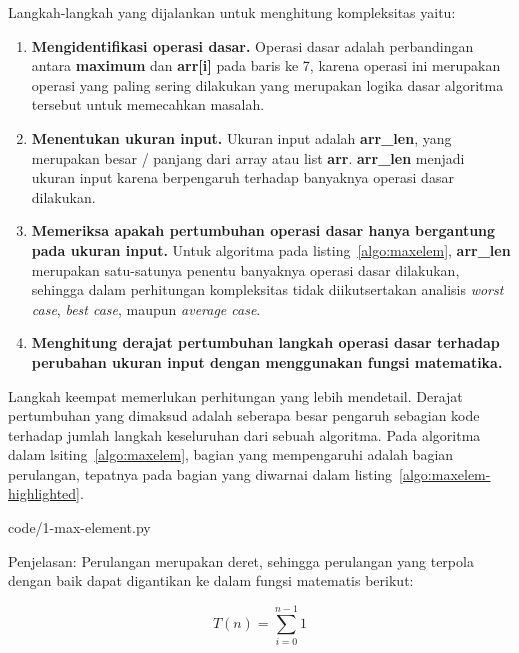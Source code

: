 \FloatBarrier

Langkah-langkah yang dijalankan untuk menghitung kompleksitas yaitu:

\begin{enumerate}
    \item \textbf{Mengidentifikasi operasi dasar.} Operasi dasar adalah perbandingan antara \textbf{maximum} dan \textbf{arr[i]} pada baris ke 7, karena operasi ini merupakan operasi yang paling sering dilakukan yang merupakan logika dasar algoritma tersebut untuk memecahkan masalah.
    \item \textbf{Menentukan ukuran input.} Ukuran input adalah \textbf{arr\_len}, yang merupakan besar / panjang dari array atau list \textbf{arr}. \textbf{arr\_len} menjadi ukuran input karena berpengaruh terhadap banyaknya operasi dasar dilakukan.
    \item \textbf{Memeriksa apakah pertumbuhan operasi dasar hanya bergantung pada ukuran input.} Untuk algoritma pada listing~\ref{algo:maxelem}, \textbf{arr\_len} merupakan satu-satunya penentu banyaknya operasi dasar dilakukan, sehingga dalam perhitungan kompleksitas tidak diikutsertakan analisis \textit{worst case}, \textit{best case}, maupun \textit{average case}.
    \item \textbf{Menghitung derajat pertumbuhan langkah operasi dasar terhadap perubahan ukuran input dengan menggunakan fungsi matematika.} 
\end{enumerate}

Langkah keempat memerlukan perhitungan yang lebih mendetail. Derajat pertumbuhan yang dimaksud adalah seberapa besar pengaruh sebagian kode terhadap jumlah langkah keseluruhan dari sebuah algoritma. Pada algoritma dalam lsiting~\ref{algo:maxelem}, bagian yang mempengaruhi adalah bagian perulangan, tepatnya pada bagian yang diwarnai dalam listing~\ref{algo:maxelem-highlighted}.


                {code/1-max-element.py}

\FloatBarrier

Penjelasan: Perulangan merupakan deret, sehingga perulangan yang terpola dengan baik dapat digantikan ke dalam fungsi matematis berikut:

\begin{equation}\label{eq:maxelem-loop}
    T(n) = \sum\limits_{i=0}^{n-1} 1
\end{equation}

